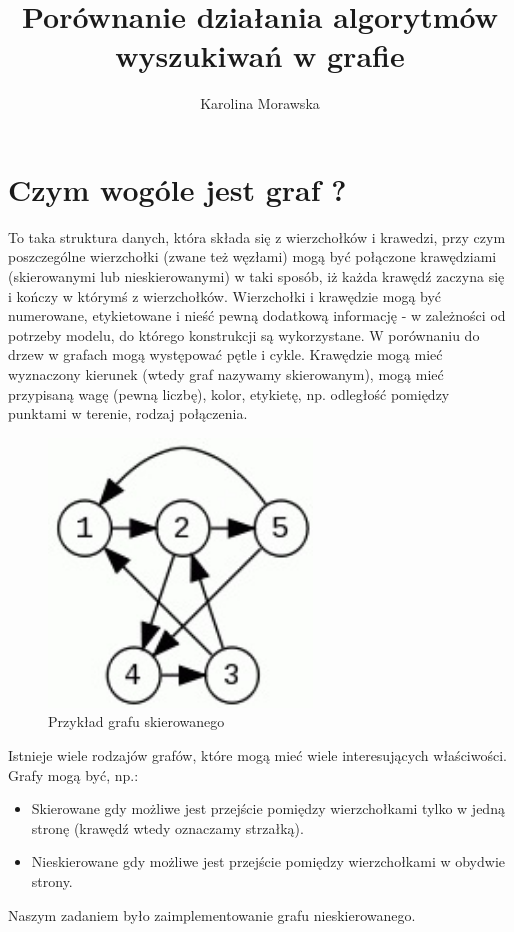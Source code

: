 \documentclass[11pt]{article}
\title{Porównanie działania algorytmów wyszukiwań w grafie}
\author{Karolina Morawska}
\begin{document}
\maketitle
\newpage
\tableofcontents
\newpage
\section{Czym wogóle jest graf ?}
 To taka struktura danych, która składa się z wierzchołków i krawedzi, przy czym poszczególne wierzchołki (zwane też węzłami) mogą być połączone krawędziami (skierowanymi lub nieskierowanymi) w taki sposób, iż każda krawędź zaczyna się i kończy w którymś z wierzchołków. Wierzchołki i krawędzie mogą być numerowane, etykietowane i nieść pewną dodatkową informację - w zależności od potrzeby modelu, do którego konstrukcji są wykorzystane. W porównaniu do drzew w grafach mogą występować pętle i cykle. Krawędzie mogą mieć wyznaczony kierunek (wtedy graf nazywamy skierowanym), mogą mieć przypisaną wagę (pewną liczbę), kolor, etykietę, np. odległość pomiędzy punktami w terenie, rodzaj połączenia.

  \begin{figure}[ht!] 
\centering
 \includegraphics[width=70mm]{grafsk}
 \caption{Przykład grafu skierowanego} 
\label{overflow}
 \end{figure}
Istnieje wiele rodzajów grafów, które mogą mieć wiele interesujących właściwości. Grafy mogą być, np.:

\begin{itemize}
\item Skierowane gdy możliwe jest przejście pomiędzy wierzchołkami tylko w jedną stronę (krawędź wtedy oznaczamy strzałką).
\item Nieskierowane gdy możliwe jest przejście pomiędzy wierzchołkami w obydwie strony.
\end{itemize}
Naszym zadaniem było zaimplementowanie grafu nieskierowanego.
\newpage
\end{document}
